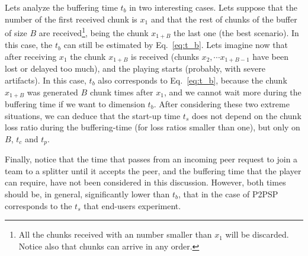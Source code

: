 
Lets analyze the buffering time $t_b$ in two interesting cases. Lets
suppose that the number of the first received chunk is $x_1$ and that
the rest of chunks of the buffer of size $B$ are received\footnote{All
  the chunks received with an number smaller than $x_1$ will be
  discarded. Notice also that chunks can arrive in any order.}, being
the chunk $x_{1+B}$ the last one (the best scenario). In this case,
the $t_b$ can still be estimated by Eq.~\ref{eq:t_b}. Lets imagine now
that after receiving $x_1$ the chunk $x_{1+B}$ is received (chunks
$x_2, \cdots x_{1+B-1}$ have been lost or delayed too much), and the
playing starts (probably, with severe artifacts). In this case, $t_b$
also corresponds to Eq.~\ref{eq:t_b}, because the chunk $x_{1+B}$ was
generated $B$ chunk times after $x_1$, and we cannot wait more during
the buffering time if we want to dimension $t_b$. After considering
these two extreme situations, we can deduce that the start-up time
$t_s$ does not depend on the chunk loss ratio during the
buffering-time (for loss ratios smaller than one), but only on $B$,
$t_c$ and $t_p$.

Finally, notice that the time that passes from an incoming peer
request to join a team to a splitter until it accepts the peer, and
the buffering time that the player can require, have not been
considered in this discussion. However, both times should be, in
general, significantly lower than $t_b$, that in the case of P2PSP
corresponds to the $t_s$ that end-users experiment.

